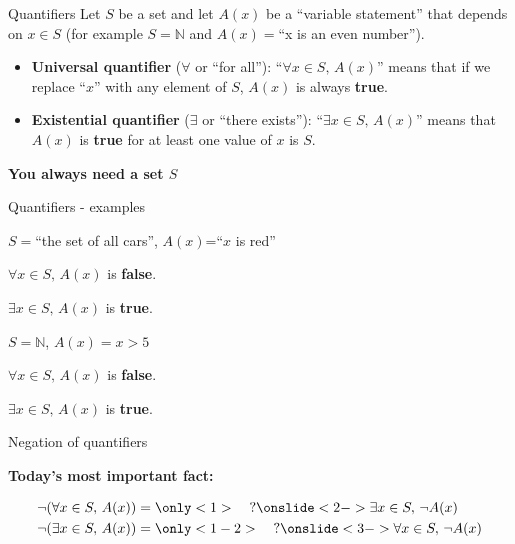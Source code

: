 \documentclass[11pt]{beamer}
\theoremstyle{definition}
\begin{document}
\begin{frame}{Quantifiers}
  Let $S$ be a set and let $A(x)$ be a ``variable statement'' that depends on
  $x\in S$ (for example $S=\mathbb{N}$ and $A(x)=$``x is an even number'').
  \pause
  \vspace{12pt}
  \begin{itemize}
    \item \textbf{Universal quantifier} ($\forall$ or ``for all''):
          ``$\forall x\in S,\,A(x)$'' means that if we replace ``$x$'' with any
          element of $S$, $A(x)$ is always \textbf{true}.
  \vspace{9pt}
    \item \textbf{Existential quantifier} ($\exists$ or ``there exists''):
          ``$\exists x\in S,\, A(x)$'' means that $A(x)$ is \textbf{true} for
          at least one value of $x$ is $S$.
  \end{itemize}
  \vspace{12pt}
  \pause
  \textbf{You always need a set $S$}
\end{frame}

\begin{frame}{Quantifiers - examples}
  \begin{example}
  $S=$``the set of all cars'', $A(x)$=``$x$ is red''

  $\forall x\in S,\, A(x)$ is \textbf{false}.

  $\exists x\in S,\, A(x)$ is \textbf{true}.
  \end{example}
  \begin{example}
    $S=\mathbb{N}$, $A(x)=x>5$

  $\forall x\in S,\, A(x)$ is \textbf{false}.

  $\exists x\in S,\, A(x)$ is \textbf{true}.
  \end{example}
\end{frame}

\begin{frame}{Negation of quantifiers}
  \begin{center}
    \textbf{Today's most important fact:}
  \end{center}
  \begin{align*}
    \neg(\forall x\in S,\, A(x))&=\only<1>{\quad?}
    \onslide<2->{\exists x\in S,\,\neg A(x)}\\
    \neg(\exists x\in S,\, A(x))&=\only<1-2>{\quad?}
    \onslide<3->{\forall x\in S,\,\neg A(x)}\\
  \end{align*}
\end{frame}
\end{document}
